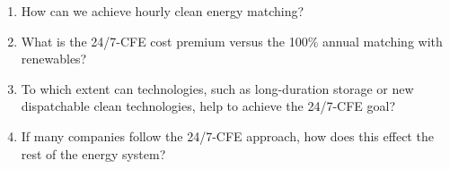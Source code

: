 \begin{enumerate}
    \item How can we achieve hourly clean energy matching? 
    \item What is the 24/7-CFE cost premium versus the 100\% annual matching with renewables? 
    \item To which extent can technologies, such as long-duration storage or new dispatchable clean technologies, help to achieve the 24/7-CFE goal? 
    \item If many companies follow the 24/7-CFE approach, how does this effect the rest of the energy system?
\end{enumerate}